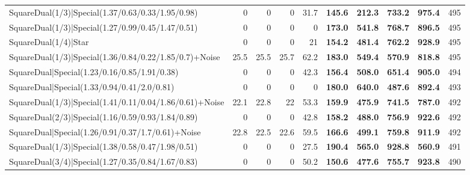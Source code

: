 \begin{tabular}{lrrrrllllr}
 SquareDual(1/3)|Special(1.37/0.63/0.33/1.95/0.98)       &          0   &          0   &          0   &            31.7 & \textbf{145.6} & \textbf{212.3} & \textbf{733.2} & \textbf{975.4}  &          495 \\
 SquareDual(1/3)|Special(1.27/0.99/0.45/1.47/0.51)       &          0   &          0   &          0   &             0   & \textbf{173.0} & \textbf{541.8} & \textbf{768.7} & \textbf{896.5}  &          495 \\
 SquareDual(1/4)|Star                                    &          0   &          0   &          0   &            21   & \textbf{154.2} & \textbf{481.4} & \textbf{762.2} & \textbf{928.9}  &          495 \\
 SquareDual(1/3)|Special(1.36/0.84/0.22/1.85/0.7)+Noise  &         25.5 &         25.5 &         25.7 &            62.2 & \textbf{183.0} & \textbf{549.4} & \textbf{570.9} & \textbf{818.8}  &          495 \\
 SquareDual|Special(1.23/0.16/0.85/1.91/0.38)            &          0   &          0   &          0   &            42.3 & \textbf{156.4} & \textbf{508.0} & \textbf{651.4} & \textbf{905.0}  &          494 \\
 SquareDual|Special(1.33/0.94/0.41/2.0/0.81)             &          0   &          0   &          0   &             0   & \textbf{180.0} & \textbf{640.0} & \textbf{487.6} & \textbf{892.4}  &          493 \\
 SquareDual(1/3)|Special(1.41/0.11/0.04/1.86/0.61)+Noise &         22.1 &         22.8 &         22   &            53.3 & \textbf{159.9} & \textbf{475.9} & \textbf{741.5} & \textbf{787.0}  &          492 \\
 SquareDual(2/3)|Special(1.16/0.59/0.93/1.84/0.89)       &          0   &          0   &          0   &            42.8 & \textbf{158.2} & \textbf{488.0} & \textbf{756.9} & \textbf{922.6}  &          492 \\
 SquareDual|Special(1.26/0.91/0.37/1.7/0.61)+Noise       &         22.8 &         22.5 &         22.6 &            59.5 & \textbf{166.6} & \textbf{499.1} & \textbf{759.8} & \textbf{911.9}  &          492 \\
 SquareDual(1/3)|Special(1.38/0.58/0.47/1.98/0.51)       &          0   &          0   &          0   &            27.5 & \textbf{190.4} & \textbf{565.0} & \textbf{928.8} & \textbf{560.9}  &          491 \\
 SquareDual(3/4)|Special(1.27/0.35/0.84/1.67/0.83)       &          0   &          0   &          0   &            50.2 & \textbf{150.6} & \textbf{477.6} & \textbf{755.7} & \textbf{923.8}  &          490 \\

\end{tabular}
